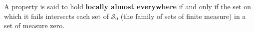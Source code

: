 A property is said to hold \textbf{locally almost everywhere} if and only if the set on which it fails intersects each set of $\mathcal{S}_0$ (the family of sets of finite measure) in a set of measure zero.
